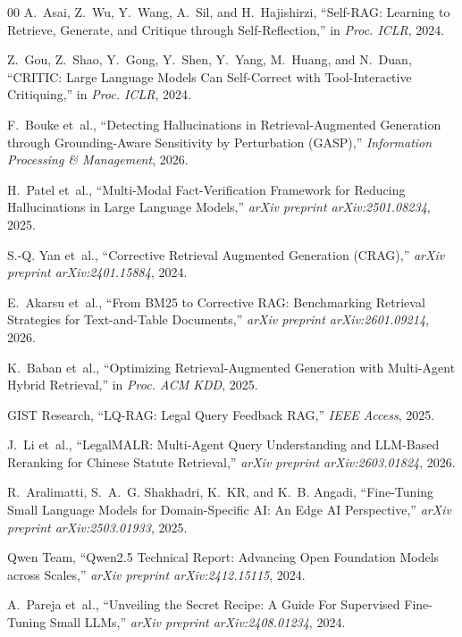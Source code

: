 \documentclass[11pt,a4paper]{article}
\begin{document}
\begin{thebibliography}{00}
A.~Asai, Z.~Wu, Y.~Wang, A.~Sil, and H.~Hajishirzi,
``Self-RAG: Learning to Retrieve, Generate, and Critique through Self-Reflection,''
in \emph{Proc. ICLR}, 2024.

Z.~Gou, Z.~Shao, Y.~Gong, Y.~Shen, Y.~Yang, M.~Huang, and N.~Duan,
``CRITIC: Large Language Models Can Self-Correct with Tool-Interactive Critiquing,''
in \emph{Proc. ICLR}, 2024.

F.~Bouke et~al.,
``Detecting Hallucinations in Retrieval-Augmented Generation through Grounding-Aware Sensitivity by Perturbation (GASP),''
\emph{Information Processing \& Management}, 2026.

H.~Patel et~al.,
``Multi-Modal Fact-Verification Framework for Reducing Hallucinations in Large Language Models,''
\emph{arXiv preprint arXiv:2501.08234}, 2025.

S.-Q. Yan et~al.,
``Corrective Retrieval Augmented Generation (CRAG),''
\emph{arXiv preprint arXiv:2401.15884}, 2024.

E.~Akarsu et~al.,
``From BM25 to Corrective RAG: Benchmarking Retrieval Strategies for Text-and-Table Documents,''
\emph{arXiv preprint arXiv:2601.09214}, 2026.

K.~Baban et~al.,
``Optimizing Retrieval-Augmented Generation with Multi-Agent Hybrid Retrieval,''
in \emph{Proc. ACM KDD}, 2025.

GIST Research,
``LQ-RAG: Legal Query Feedback RAG,''
\emph{IEEE Access}, 2025.

J.~Li et~al.,
``LegalMALR: Multi-Agent Query Understanding and LLM-Based Reranking for Chinese Statute Retrieval,''
\emph{arXiv preprint arXiv:2603.01824}, 2026.

R.~Aralimatti, S.~A.~G. Shakhadri, K.~KR, and K.~B. Angadi,
``Fine-Tuning Small Language Models for Domain-Specific AI: An Edge AI Perspective,''
\emph{arXiv preprint arXiv:2503.01933}, 2025.

Qwen Team,
``Qwen2.5 Technical Report: Advancing Open Foundation Models across Scales,''
\emph{arXiv preprint arXiv:2412.15115}, 2024.

A.~Pareja et~al.,
``Unveiling the Secret Recipe: A Guide For Supervised Fine-Tuning Small LLMs,''
\emph{arXiv preprint arXiv:2408.01234}, 2024.


\end{thebibliography}
\end{document}
